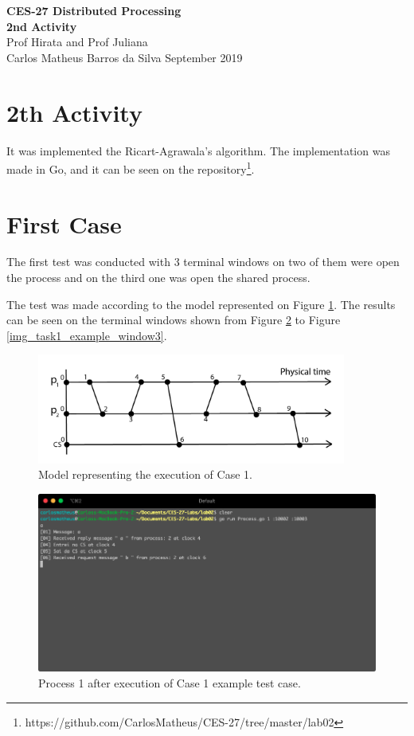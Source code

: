 \documentclass[a4paper, 11pt]{article}
\begin{document}
\noindent
\large\textbf{CES-27 Distributed Processing} \\
\textbf{2nd Activity} \\
\normalsize Prof Hirata and Prof Juliana  \\
Carlos Matheus Barros da Silva \hfill September 2019

\section*{2th Activity}

It was implemented the Ricart-Agrawala's algorithm. The implementation was made in Go, and it can be seen on the repository\footnote{https://github.com/CarlosMatheus/CES-27/tree/master/lab02}.

\section*{First Case}

The first test was conducted with 3 terminal windows on two of them were open the process and on the third one was open the shared process.

The test was made according to the model represented on Figure \ref{img_task1}. The results can be seen on the terminal windows shown from Figure \ref{img_task1_example_window1} to Figure \ref{img_task1_example_window3}.

\begin{figure}[h]
  \begin{center}
  \includegraphics[width=4in]{./imgs/case1.png}
  \caption{Model representing the execution of Case 1.}
  \label{img_task1}
  \end{center}
\end{figure}

\begin{figure}[h]
  \begin{center}
  \includegraphics[width=4.5in]{./imgs/case1process1.png}
  \caption{Process 1 after execution of Case 1 example test case.}
  \label{img_task1_example_window1}
  \end{center}
\end{figure}
\end{document}
